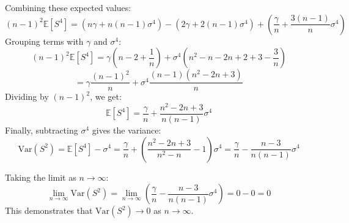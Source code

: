 \documentclass[12pt,a4paper]{article}\usepackage[]{graphicx}\usepackage[]{xcolor}
\begin{document}
\begin{enumerate}[label=\arabic*.]
\begin{enumerate}[label=(\alph*)]
        Combining these expected values:
        $$ (n-1)^2 \mathbb{E}[S^4] = (n\gamma + n(n-1)\sigma^4) - (2\gamma + 2(n-1)\sigma^4) + \left(\frac{\gamma}{n} + \frac{3(n-1)}{n}\sigma^4\right) $$
        Grouping terms with $\gamma$ and $\sigma^4$:
        $$ (n-1)^2 \mathbb{E}[S^4] = \gamma\left(n - 2 + \frac{1}{n}\right) + \sigma^4\left(n^2 - n - 2n + 2 + 3 - \frac{3}{n}\right) $$
        $$ = \gamma\frac{(n-1)^2}{n} + \sigma^4\frac{(n-1)(n^2 - 2n + 3)}{n} $$
        Dividing by $(n-1)^2$, we get:
        $$ \mathbb{E}[S^4] = \frac{\gamma}{n} + \frac{n^2 - 2n + 3}{n(n-1)}\sigma^4 $$
        Finally, subtracting $\sigma^4$ gives the variance:
        $$ \text{Var}(S^2) = \mathbb{E}[S^4] - \sigma^4 = \frac{\gamma}{n} + \left(\frac{n^2 - 2n + 3}{n^2 - n} - 1\right)\sigma^4 = \frac{\gamma}{n} - \frac{n-3}{n(n-1)}\sigma^4 $$
        
        Taking the limit as $n \to \infty$:
        $$ \lim_{n \to \infty} \text{Var}(S^2) = \lim_{n \to \infty} \left(\frac{\gamma}{n} - \frac{n-3}{n(n-1)}\sigma^4\right) = 0 - 0 = 0 $$
        This demonstrates that $\text{Var}(S^2) \to 0$ as $n \to \infty$.
    \end{enumerate}


\end{enumerate}
\end{document}
